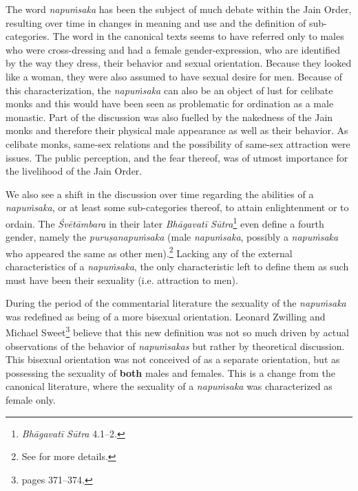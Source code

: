 The word {\em napuṁsaka} has been the subject of much debate within the Jain Order, resulting over time in changes in meaning and use and the definition of sub-categories. The word in the canonical texts seems to have referred only to males who were cross-dressing and had a female gender-expression, who are identified by the way they dress, their behavior and sexual orientation. Because they looked like a woman, they were also assumed to have sexual desire for men. Because of this characterization, the {\em napuṁsaka} can also be an object of lust for celibate monks and this would have been seen as problematic for ordination as a male monastic. Part of the discussion was also fuelled by the nakedness of the Jain monks and therefore their physical male appearance as well as their behavior. As celibate monks, same-sex relations and the possibility of same-sex attraction were issues. The public perception, and the fear thereof, was of utmost importance for the livelihood of the Jain Order. 

We also see a shift in the discussion over time regarding the abilities of a {\em napuṁsaka}, or at least some sub-categories thereof, to attain enlightenment or to ordain. The {\em Śvētāmbara} in their later {\em Bhāgavatī Sūtra}\footnote{{\em Bhāgavatī Sūtra} 4.1–2.} even define a fourth gender, namely the {\em puruṣanapuṁsaka} (male {\em napuṁsaka}, possibly a {\em napuṁsaka} who appeared the same as other men).\footnote{See \cite{zwilling} for more details.} Lacking any of the external characteristics of a {\em napuṁsaka}, the only characteristic left to define them as such must have been their sexuality (i.e. attraction to men).

During the period of the commentarial literature the sexuality of the {\em napuṁsaka} was redefined as being of a more bisexual orientation. Leonard Zwilling and Michael Sweet\footnote{\cite{zwilling} pages 371–374.} believe that this new definition was not so much driven by actual observations of the behavior of {\em napuṁsakas} but rather by theoretical discussion. This bisexual orientation was not conceived of as a separate orientation, but as possessing the sexuality of \textbf{both} males and females. This is a change from the canonical literature, where the sexuality of a {\em napuṁsaka} was characterized as female only.

